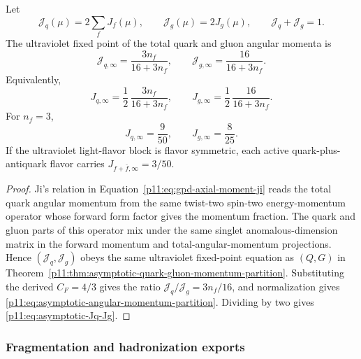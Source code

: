 \documentclass[12pt,a4paper]{article}
\begin{document}
\begin{corollary}
\label{p11:cor:asymptotic-quark-gluon-angular-momentum-partition}
Let
\[
\mathcal J_q(\mu)=2\sum_fJ_f(\mu),
\qquad
\mathcal J_g(\mu)=2J_g(\mu),
\qquad
\mathcal J_q+\mathcal J_g=1 .
\]
The ultraviolet fixed point of the total quark and gluon angular momenta is
\begin{equation}
\label{p11:eq:asymptotic-angular-momentum-partition}
\mathcal J_{q,\infty}
=
\frac{3n_f}{16+3n_f},
\qquad
\mathcal J_{g,\infty}
=
\frac{16}{16+3n_f}.
\end{equation}
Equivalently,
\begin{equation}
\label{p11:eq:asymptotic-Jq-Jg}
J_{q,\infty}
=
\frac12\,\frac{3n_f}{16+3n_f},
\qquad
J_{g,\infty}
=
\frac12\,\frac{16}{16+3n_f}.
\end{equation}
For \(n_f=3\),
\begin{equation}
\label{p11:eq:asymptotic-Jq-Jg-three-flavors}
J_{q,\infty}=\frac9{50},
\qquad
J_{g,\infty}=\frac8{25}.
\end{equation}
If the ultraviolet light-flavor block is flavor symmetric, each active
quark-plus-antiquark flavor carries \(J_{f+\bar f,\infty}=3/50\).
\end{corollary}
\begin{proof}
Ji's relation in Equation~\eqref{p11:eq:gpd-axial-moment-ji} reads the total
quark angular momentum from the same twist-two spin-two energy-momentum
operator whose forward form factor gives the momentum fraction.  The quark and
gluon parts of this operator mix under the same singlet anomalous-dimension
matrix in the forward momentum and total-angular-momentum projections.  Hence
\((\mathcal J_q,\mathcal J_g)\) obeys the same ultraviolet fixed-point equation
as \((Q,G)\) in Theorem~\ref{p11:thm:asymptotic-quark-gluon-momentum-partition}.
Substituting the derived \(C_F=4/3\) gives the ratio
\(\mathcal J_q/\mathcal J_g=3n_f/16\), and normalization gives
\eqref{p11:eq:asymptotic-angular-momentum-partition}.  Dividing by two gives
\eqref{p11:eq:asymptotic-Jq-Jg}.
\end{proof}



\subsubsection{Fragmentation and hadronization exports}
\label{p11:subsec:fragmentation-hadronization-exports}
\end{document}

